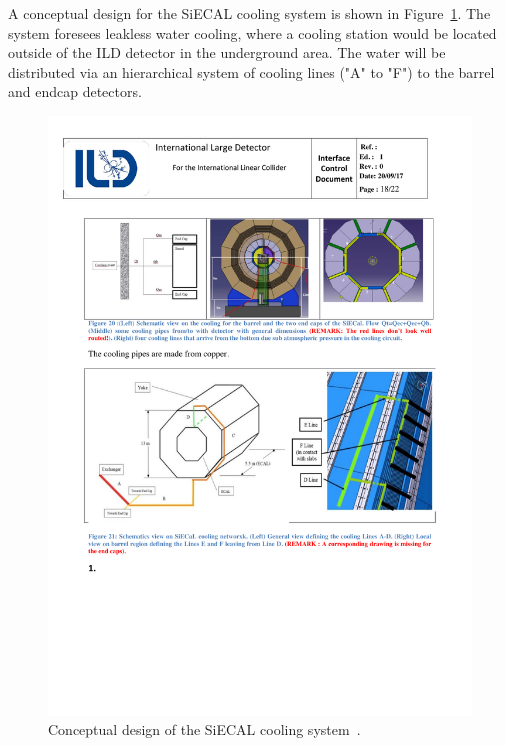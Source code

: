 A conceptual design for the SiECAL cooling system is shown in Figure~\ref{ILD:fig:siecal_cooling}. The system foresees leakless water cooling, where a cooling station would be located outside of the ILD detector in the underground area. The water will be distributed via an hierarchical system of cooling lines ("A" to "F") to the barrel and endcap detectors.

\begin{figure}[h!]
    \centering
        \includegraphics[width=0.8\hsize]{Integration/fig/SiECAL_Cooling.pdf}
    \caption{Conceptual design of the SiECAL cooling system~\cite{ild:bib:SiECAL_ICD}.}
    \label{ILD:fig:siecal_cooling}
\end{figure}

